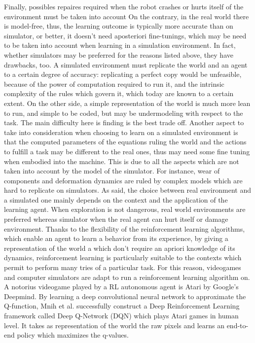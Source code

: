 Finally, possibles repaires required when the robot crashes or hurts itself of the environment must be taken into account
On the contrary, in the real world there is model-free, thus, the learning outcome is typically more accurate than on simulator, or better, it doesn't need aposteriori fine-tunings, which may be need to be taken into account when learning in a simulation environment. In fact, whether simulators may be preferred for the reasons listed above, they have drawbacks, too.
A simulated environment must replicate the world and an agent to a certain degree of accuracy: replicating a perfect copy would be unfeasible, because of the power of computation required to run it, and the intrinsic complexity of the rules which govern it, which today are known to a certain extent. On the other side, a simple representation of the world is much more lean to run, and simple to be coded, but may be undermodeling with respect to the task. The main difficulty here is finding is the best trade off. Another aspect to take into consideration when choosing to learn on a simulated environment is that the computed parameters of the equations ruling the world and the actions to fulfill a task may be different to the real ones, thus may need some fine tuning when embodied into the machine. This is due to all the aspects which are not taken into account by the model of the simulator. For instance, wear of components and deformation dynamics are ruled by complex models which are hard to replicate on simulators.
As said, the choice between real environment and a simulated one mainly depends on the context and the application of the learning agent. When exploration is not dangerous, real world environments are preferred whereas simulator when the real agent can hurt itself or damage environment.
Thanks to the flexibility of the reinforcement learning algorithms, which enable an agent to learn a behavior from its experience, by giving a representation of the world a which don't require an apriori knowledge of its dynamics, reinforcement learning is particularly suitable to the contexts which permit to perform many tries of a particular task. For this reason, videogames and computer simulators are adapt to run a reinforcement learning algorithm on.
A notorius videogame played by a RL autonomous agent is Atari \cite{atari} by Google's Deepmind. By learning a deep convolutional neural network to approximate the Q-function, Mnih et al. successfully construct a Deep Reinforcement Learning framework called Deep Q-Network (DQN) which plays Atari games in human level. It takes as representation of the world the raw pixels and learns an end-to-end policy which maximizes the q-values.
